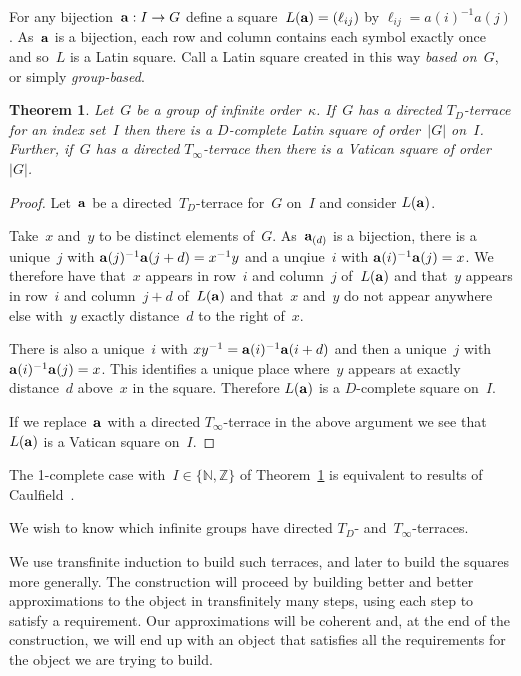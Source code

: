 \documentclass[12pt,a4paper]{article}
\newtheorem{thm}{Theorem}[section]
\newcommand{\Z}{\mathbb{Z}}
\newcommand{\N}{\mathbb{N}}
\begin{document}
For any bijection~${\bf a}: I \rightarrow G$ define a square~$L({\bf a}) = (\ell_{ij})$ by $\ell_{ij} = a(i)^{-1}a(j)$.   As~${\bf a}$ is a bijection, each row and column contains each symbol exactly once and so~$L$ is a Latin square.  Call a Latin square created in this way {\em based on~$G$}, or simply {\em group-based}.

\begin{thm}\label{th:terrace2square}
Let~$G$ be a group of infinite order~$\kappa$.  If~$G$ has a directed $T_{D}$-terrace for an index set~$I$ then there is a $D$-complete Latin square of order~$|G|$ on~$I$.  Further, if~$G$ has a directed $T_{\infty}$-terrace then there is a Vatican square of order~$|G|$.
\end{thm}

\begin{proof}
Let~${\bf a}$ be a directed~$T_D$-terrace for~$G$ on~$I$ and consider $L({\bf a})$.

Take~$x$ and~$y$ to be distinct elements of~$G$.  As~${\bf a}_{(d)}$ is a bijection, there is a unique~$j$ with ${\bf a}(j)^{-1}{\bf a}(j+d) = x^{-1}y$ and a unqiue~$i$ with ${\bf a}(i)^{-1}{\bf a}(j)=x$.  We therefore have that~$x$ appears in row~$i$ and column~$j$ of~$L({\bf a})$ and that~$y$ appears in row~$i$ and column~$j+d$ of~$L({\bf a})$ and that~$x$ and~$y$ do not appear anywhere else with~$y$ exactly distance~$d$  to the right of~$x$.

There is also a unique~$i$ with $xy^{-1} = {\bf a}(i)^{-1}{\bf a}(i+d)$ and then a unique~$j$ with ${\bf a}(i)^{-1}{\bf a}(j)=x$.  This identifies a unique place where~$y$ appears at exactly distance~$d$ above~$x$ in the square.  Therefore $L({\bf a})$ is a $D$-complete square on~$I$.

If we replace~${\bf a}$ with a directed $T_{\infty}$-terrace in the above argument we see that~$L({\bf a})$ is a Vatican square on~$I$.
\end{proof}

The 1-complete case with~$I \in \{ \N, \Z \}$ of Theorem~\ref{th:terrace2square} is equivalent to results of Caulfield~\cite{Caulfield96}.

We wish to know which infinite groups have directed $T_D$- and~$T_{\infty}$-terraces.  

We use transfinite induction to build such terraces, and later to build the squares more generally. 
The construction will proceed by building better and better approximations to the object in transfinitely many steps, using each step to satisfy a requirement. Our approximations will be coherent and, at the end of the construction, we will end up with an object that satisfies all the requirements for the object we are trying to build.
\end{document}
